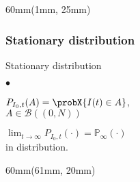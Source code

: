 \begin{frame}
    \begin{textblock*}{60mm}(1mm, 25mm)
        \frametitle{Stationary distribution}
        \begin{greenbox}{Stationary distribution}
            \begin{list}{$\bullet$}{}
                \item
                    $
                        P_{I_0,t}(A)
                        = \probX{I(t)\in A}
                    $,
                    \\
                    $A \in \mathcal{B}((0, N))$
                \item
                    $
                        \displaystyle
                        \lim_{t \to \infty}
                        P_{I_0,t}(\cdot)
                        = \mathbb{P}_{\infty}(\cdot)
                    $ 
                    \\
                    in distribution.
            \end{list}
        \end{greenbox}
    \end{textblock*}
    \begin{textblock*}{60mm}(61mm, 20mm)
    \end{textblock*}
\end{frame}

